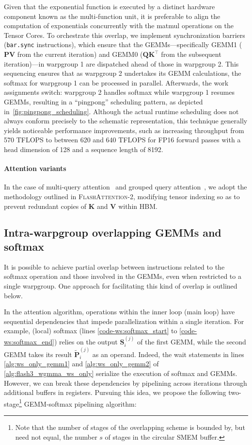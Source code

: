 Given that the exponential function is executed by a distinct hardware component known as the multi-function unit, it is preferable to align the computation of exponentials concurrently with the matmul operations on the Tensor Cores. To orchestrate this overlap, we implement synchronization barriers (\texttt{bar.sync} instructions), which ensure that the GEMMs—specifically GEMM1 (\(\mathbf{P}\mathbf{V}\) from the current iteration) and GEMM0 (\(\mathbf{Q} \mathbf{K}^\top\) from the subsequent iteration)—in warpgroup 1 are dispatched ahead of those in warpgroup 2. This sequencing ensures that as warpgroup 2 undertakes its GEMM calculations, the softmax for warpgroup 1 can be processed in parallel. Afterwards, the work assignments switch: warpgroup 2 handles softmax while warpgroup 1 resumes GEMMs, resulting in a “pingpong” scheduling pattern, as depicted in~\cref{fig:pingpong_scheduling}. Although the actual runtime scheduling does not always conform precisely to the schematic representation, this technique generally yields noticeable performance improvements, such as increasing throughput from 570 TFLOPS to between 620 and 640 TFLOPS for FP16 forward passes with a head dimension of 128 and a sequence length of 8192.

\paragraph{Attention variants} In the case of multi-query attention~\citep{shazeer2019fast} and grouped query attention~\citep{ainslie2023gqa}, we adopt the methodology outlined in \textsc{FlashAttention-2}, modifying tensor indexing so as to prevent redundant copies of $\mathbf{K}$ and $\mathbf{V}$ within HBM.

\subsection{Intra-warpgroup overlapping GEMMs and softmax}

It is possible to achieve partial overlap between instructions related to the softmax operation and those involved in the GEMMs, even when restricted to a single warpgroup. One approach for facilitating this kind of overlap is outlined below.

In the attention algorithm, operations within the inner loop (main loop) have sequential dependencies that impede parallelization within a single iteration. For example, (local) softmax (lines \ref{code-ws:softmax_start} to \ref{code-ws:softmax_end}) relies on the output $\mathbf{S}_i^{(j)}$ of the first GEMM, while the second GEMM takes its result $\widetilde{\mathbf{P}}_i^{(j)}$ as an operand. Indeed, the wait statements in lines \ref{alg:ws_only_gemm1} and \ref{alg:ws_only_gemm2} of \cref{alg:flash3_wgmma_ws_only} serialize the execution of softmax and GEMMs. However, we can break these dependencies by pipelining across iterations through additional buffers in registers. Pursuing this idea, we propose the following two-stage\footnote{Note that the number of stages of the overlapping scheme is bounded by, but need not equal, the number $s$ of stages in the circular SMEM buffer.} GEMM-softmax pipelining algorithm:

